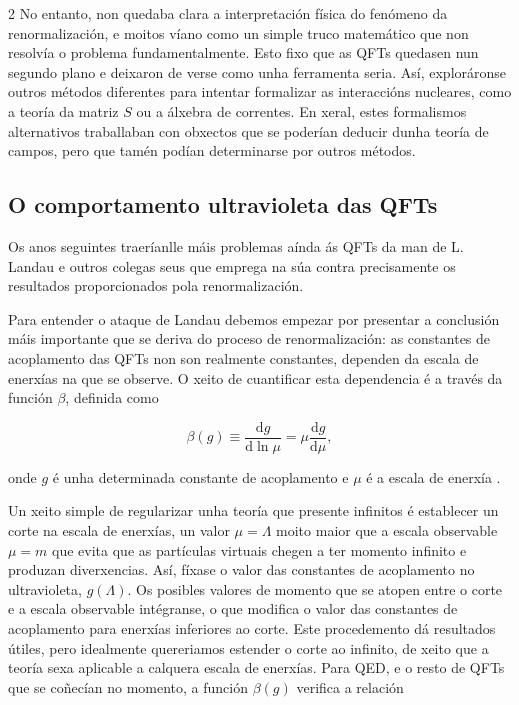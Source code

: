 \begin{multicols}{2}
No entanto, non quedaba clara a interpretación física do fenómeno da
renormalización, e moitos víano como un simple truco matemático que non
resolvía o problema fundamentalmente. Esto fixo que as QFTs quedasen nun
segundo plano e deixaron de verse como unha ferramenta seria. Así, exploráronse
outros métodos diferentes para intentar formalizar as interaccións nucleares,
como a teoría da matriz $S$ ou a álxebra de correntes. En xeral, estes
formalismos alternativos traballaban con obxectos que se poderían deducir dunha
teoría de campos, pero que tamén podían determinarse por outros métodos.

\subsection*{O comportamento ultravioleta das QFTs}

Os anos seguintes traeríanlle máis problemas aínda ás QFTs da man de L. Landau
e outros colegas seus que emprega na súa contra precisamente os resultados
proporcionados pola renormalización.

Para entender o ataque de Landau debemos empezar por presentar a conclusión
máis importante que se deriva do proceso de renormalización: as constantes de
acoplamento das QFTs non son realmente constantes, dependen da escala de
enerxías na que se observe. O xeito de cuantificar esta dependencia é a través
da función $\beta$, definida como

\begin{equation}
    \beta(g) \equiv \frac{\text{d}g}{\text{d} \ln \mu} = \mu
    \frac{\text{d}g}{\text{d}\mu},
\end{equation}

\noindent onde $g$ é unha determinada constante de acoplamento e $\mu$ é a
escala de enerxía \cite{Ramond}.

Un xeito simple de regularizar unha teoría que presente infinitos é establecer
un corte na escala de enerxías, un valor $\mu=\Lambda$ moito maior que a escala
observable $\mu=m$ que evita que as partículas virtuais chegen a ter momento
infinito e produzan diverxencias. Así, fíxase o valor das constantes de
acoplamento no ultravioleta, $g(\Lambda)$. Os posibles valores de momento que
se atopen entre o corte e a escala observable intégranse, o que modifica o
valor das constantes de acoplamento para enerxías inferiores ao corte. Este
procedemento dá resultados útiles, pero idealmente quereriamos estender o corte
ao infinito, de xeito que a teoría sexa aplicable a calquera escala de
enerxías. Para QED, e o resto de QFTs que se coñecían no momento, a función
$\beta(g)$ verifica a relación \cite{Srednicki}


\end{multicols}
